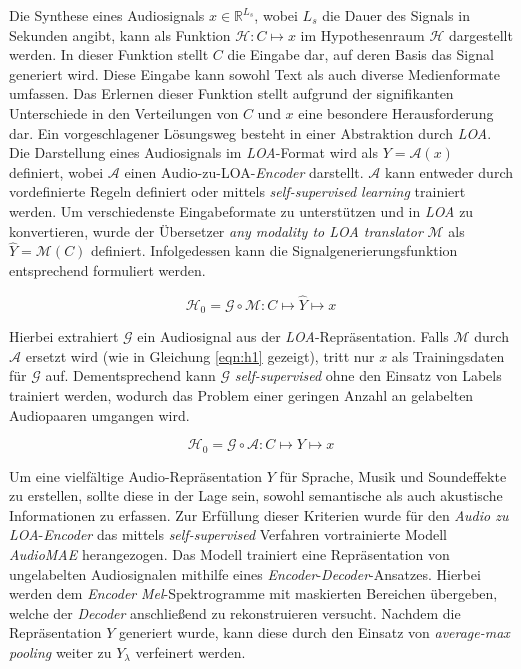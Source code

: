 \documentclass[
  a4paper,  %
  twoside,  %
  bibliography=totoc,
  headsepline,
  cleardoublepage=empty,
  parskip=half,
  draft=false
]{scrbook}
\begin{document}
Die Synthese eines Audiosignals $x \in \mathbb{R}^{L_s}$, wobei $L_s$ die Dauer des Signals in Sekunden angibt, kann als Funktion $\mathcal{H}: C \mapsto x$ im Hypothesenraum $\mathcal{H}$ dargestellt werden. In dieser Funktion stellt $C$ die Eingabe dar, auf deren Basis das Signal generiert wird. Diese Eingabe kann sowohl Text als auch diverse Medienformate umfassen. Das Erlernen dieser Funktion stellt aufgrund der signifikanten Unterschiede in den Verteilungen von $C$ und $x$ eine besondere Herausforderung dar. Ein vorgeschlagener Lösungsweg besteht in einer Abstraktion durch \emph{LOA}. Die Darstellung eines Audiosignals im \emph{LOA}-Format wird als $Y=\mathcal{A}(x)$ definiert, wobei $\mathcal{A}$ einen Audio-zu-LOA-\emph{Encoder} darstellt. $\mathcal{A}$ kann entweder durch vordefinierte Regeln definiert oder mittels \emph{self-supervised learning} \cite{tan_regeneration_2023} trainiert werden. Um verschiedenste Eingabeformate zu unterstützen und in \emph{LOA} zu konvertieren, wurde der Übersetzer \emph{any modality to LOA translator} $\mathcal{M}$ als $\hat{Y}=\mathcal{M}(C)$ definiert. Infolgedessen kann die Signalgenerierungsfunktion entsprechend formuliert werden. \cite{liu_audioldm2_2023}

\begin{equation}
    \mathcal{H}_0=\mathcal{G} \circ \mathcal{M}: C \mapsto \hat{Y} \mapsto x
\end{equation}

Hierbei extrahiert $\mathcal{G}$ ein Audiosignal aus der \emph{LOA}-Repräsentation. Falls $\mathcal{M}$ durch $\mathcal{A}$ ersetzt wird  (wie in Gleichung \ref{eqn:h1} gezeigt), tritt nur $x$ als Trainingsdaten für $\mathcal{G}$ auf. Dementsprechend kann $\mathcal{G}$ \emph{self-supervised} ohne den Einsatz von Labels trainiert werden, wodurch das Problem einer geringen Anzahl an gelabelten Audiopaaren umgangen wird. \cite{liu_audioldm2_2023}

\begin{equation}
\label{eqn:h1}
    \mathcal{H}_0=\mathcal{G} \circ \mathcal{A}: C \mapsto Y \mapsto x
\end{equation}

Um eine vielfältige Audio-Repräsentation $Y$ für Sprache, Musik und Soundeffekte zu erstellen, sollte diese in der Lage sein, sowohl semantische als auch akustische Informationen zu erfassen. Zur Erfüllung dieser Kriterien wurde für den \emph{Audio zu LOA}-\emph{Encoder} das mittels \emph{self-supervised} Verfahren vortrainierte Modell \emph{AudioMAE} \cite{huang_masked_2023} herangezogen. Das Modell trainiert eine Repräsentation von ungelabelten Audiosignalen mithilfe eines \emph{Encoder}-\emph{Decoder}-Ansatzes. Hierbei werden dem \emph{Encoder} \emph{Mel}-Spektrogramme mit maskierten Bereichen übergeben, welche der \emph{Decoder} anschließend zu rekonstruieren versucht. Nachdem die Repräsentation $Y$ generiert wurde, kann diese durch den Einsatz von \emph{average-max pooling} \cite{liu_simple_2023} weiter zu $Y_\lambda$ verfeinert werden. \cite{liu_audioldm2_2023}
\end{document}
